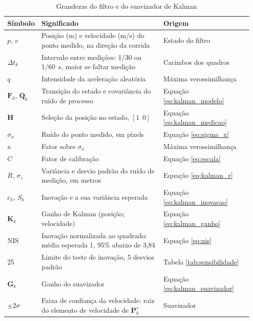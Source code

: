 \documentclass[
    12pt,               %
    openright,          %
    twoside,            %
    a4paper,            %
    chapter=TITLE,      %
    english,            %
    brazil              %
    ]{abntex2}
\begin{document}
\begin{table}[H]
\centering
\footnotesize
\caption{Grandezas do filtro e do suavizador de Kalman}
\label{tab:grandezas}
\begin{tabular}{L{0.12\textwidth}L{0.48\textwidth}L{0.28\textwidth}}
\hline
\textbf{Símbolo} & \textbf{Significado} & \textbf{Origem} \\
\hline
$p$, $v$ & Posição (m) e velocidade (m/s) do ponto medido, na direção da corrida & Estado do filtro \\
$\Delta t_k$ & Intervalo entre medições: 1/30 ou 1/60~s, maior se faltar medição & Carimbos dos quadros \\
$q$ & Intensidade da aceleração aleatória & Máxima verossimilhança \\
$\mathbf{F}_k$, $\mathbf{Q}_k$ & Transição do estado e covariância do ruído de processo & Equação \ref{eq:kalman_modelo} \\
$\mathbf{H}$ & Seleção da posição no estado, $[1\ \ 0]$ & Equação \ref{eq:kalman_medicao} \\
$\sigma_x$ & Ruído do ponto medido, em pixels & Equação \ref{eq:sigma_x} \\
$\kappa$ & Fator sobre $\sigma_x$ & Máxima verossimilhança \\
$C$ & Fator de calibração & Equação \ref{eq:escala} \\
$R$, $\sigma_z$ & Variância e desvio padrão do ruído de medição, em metros & Equação \ref{eq:kalman_r} \\
$e_k$, $S_k$ & Inovação e a sua variância esperada & Equação \ref{eq:kalman_inovacao} \\
$\mathbf{K}_k$ & Ganho de Kalman (posição; velocidade) & Equação \ref{eq:kalman_ganho} \\
NIS & Inovação normalizada ao quadrado: média esperada 1, 95\% abaixo de 3,84 & Equação \ref{eq:nis} \\
25 & Limite do teste de inovação, 5 desvios padrão & Tabela \ref{tab:sensibilidade} \\
$\mathbf{G}_k$ & Ganho do suavizador & Equação \ref{eq:kalman_suavizador} \\
$\pm 2\sigma$ & Faixa de confiança da velocidade: raiz do elemento de velocidade de $\mathbf{P}_k^s$ & Suavizador \\
\hline
\end{tabular}
\end{table}

\end{document}
